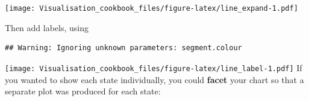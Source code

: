 \documentclass[]{book}
\newenvironment{Shaded}{\begin{snugshade}}{\end{snugshade}}
\newcommand{\DataTypeTok}[1]{\textcolor[rgb]{0.13,0.29,0.53}{#1}}
\newcommand{\DecValTok}[1]{\textcolor[rgb]{0.00,0.00,0.81}{#1}}
\newcommand{\FloatTok}[1]{\textcolor[rgb]{0.00,0.00,0.81}{#1}}
\newcommand{\KeywordTok}[1]{\textcolor[rgb]{0.13,0.29,0.53}{\textbf{#1}}}
\newcommand{\NormalTok}[1]{#1}
\newcommand{\OperatorTok}[1]{\textcolor[rgb]{0.81,0.36,0.00}{\textbf{#1}}}
\newcommand{\OtherTok}[1]{\textcolor[rgb]{0.56,0.35,0.01}{#1}}
\newcommand{\StringTok}[1]{\textcolor[rgb]{0.31,0.60,0.02}{#1}}
\begin{document}
\texttt{[image: Visualisation\_cookbook\_files/figure-latex/line\_expand-1.pdf]}

Then add labels, using

\begin{Shaded}
\end{Shaded}

\begin{verbatim}
## Warning: Ignoring unknown parameters: segment.colour
\end{verbatim}

\texttt{[image: Visualisation\_cookbook\_files/figure-latex/line\_label-1.pdf]}
If you wanted to show each state individually, you could \textbf{facet} your chart so that a separate plot was produced for each state:
\end{document}
